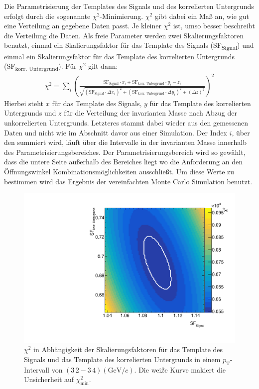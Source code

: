Die Parametrisierung der Templates des Signals und des korrelierten Untergrunds erfolgt durch die sogenannte $\chi^{2}$-Minimierung.
$\chi^{2}$ gibt dabei ein Maß an, wie gut eine Verteilung an gegebene Daten passt.
Je kleiner $\chi^{2}$ ist, umso besser beschreibt die Verteilung die Daten.
Als freie Parameter werden zwei Skalierungsfaktoren benutzt, einmal ein Skalierungsfaktor für das Template des Signals (SF\textsubscript{Signal}) und einmal ein Skalierungsfaktor für das Template des korrelierten Untergrunds (SF\textsubscript{korr. Untergrund}).
Für $\chi^{2}$ gilt dann:
\begin{align}
\chi^{2} = \sum_{i}\left(\frac{\text{SF}_\text{Signal}\cdot x_{i}+\text{SF}_\text{korr. Untergrund}\cdot y_{i}-z_{i}}{\sqrt{\left(\text{SF}_\text{Signal}\cdot\Delta x_{i}\right)^{2}+\left(\text{SF}_\text{korr. Untergrund}\cdot\Delta y_{i}\right)^{2}+\left(\Delta z\right)^{2}}}\right)^{2}
\label{eq:Chi2}
\end{align}
Hierbei steht $x$ für das Template des Signals, $y$ für das Template des korrelierten Untergrunds und $z$ für die Verteilung der invarianten Masse nach Abzug der unkorrelierten Untergrunds.
Letzteres stammt dabei wieder aus den gemessenen Daten und nicht wie im Abschnitt davor aus einer Simulation.
Der Index $i$, über den summiert wird, läuft über die Intervalle in der invarianten Masse innerhalb des Parametrisierungsbereiches.
Der Parametrisierungsbereich wird so gewählt, dass die untere Seite außerhalb des Bereiches liegt wo die Anforderung an den Öffnungswinkel Kombinationsmöglichkeiten ausschließt.
Um diese Werte zu bestimmen wird das Ergebnis der vereinfachten Monte Carlo Simulation benutzt.
\begin{figure}[tp]
\centering
\includegraphics[width=.65\linewidth]{Chi2Map10_Data_2016.pdf}
\caption{$\chi^{2}$ in Abhängigkeit der Skalierungsfaktoren für das Template des Signals und das Template des korrelierten Untergrunds in einem $p_{\text{T}}$-Intervall von $(3\,2 - 3\,4)(\text{GeV}/c)$.
Die weiße Kurve makiert die Unsicherheit auf $\chi^{2}_\text{min}$.}
\label{fig:Chi2Map}
\end{figure}
